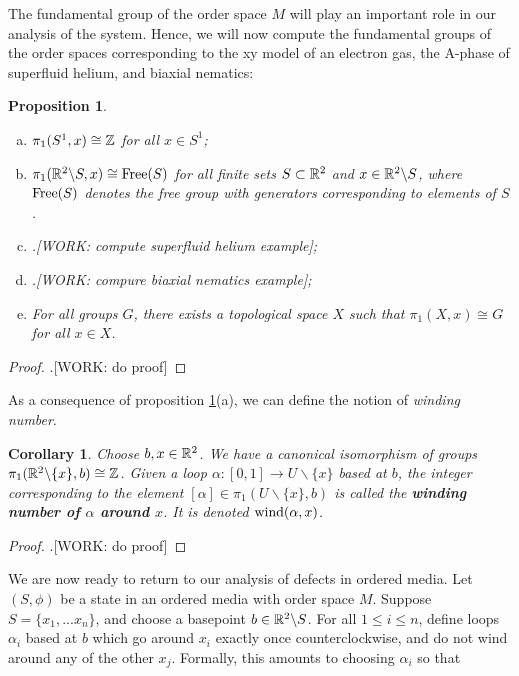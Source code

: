 \documentclass{article}
\newtheorem{corollary}{Corollary}[section]
\newtheorem{proposition}{Proposition}[section]
\theoremstyle{definition}
\numberwithin{figure}{section}
\begin{document}
The fundamental group of the order space $M$ will play an important role in our analysis of the system. Hence, we will now compute the fundamental groups of the order spaces corresponding to the xy model of an electron gas, the A-phase of superfluid helium, and biaxial nematics:

\begin{proposition}$\,$
\label{fundamental-group-computations}
\begin{enumerate}[(a)]
\item $\pi_1(S^1,x)\cong \mathbb{Z}$ for all $x\in S^1$;
\item $\pi_1(\mathbb{R}^2\backslash S,x)\cong\mathrm{Free}(S)$ for all finite sets $S\subset \mathbb{R}^2$ and $x\in \mathbb{R}^2\backslash S$, where $\mathrm{Free}(S)$ denotes the free group with generators corresponding to elements of $S$.
\item .[WORK: compute superfluid helium example];
\item .[WORK: compure biaxial nematics example];
\item For all groups $G$, there exists a topological space $X$ such that $\pi_1(X,x)\cong G$ for all $x\in X$.
\end{enumerate}
\end{proposition}
\begin{proof}.[WORK: do proof]
\end{proof}

As a consequence of proposition \ref{fundamental-group-computations}(a), we can define the notion of \textit{winding number}.

\begin{corollary} Choose $b,x\in \mathbb{R}^2$. We have a canonical isomorphism of groups $\pi_1(\mathbb{R}^2\backslash \{x\},b)\cong \mathbb{Z}$. Given a loop $\alpha:[0,1]\to U\backslash \{x\}$ based at $b$, the integer corresponding to the element $[\alpha]\in \pi_1(U\backslash \{x\},b)$ is called the \textbf{winding number of $\alpha$ around $x$}. It is denoted $\mathrm{wind}(\alpha,x)$.
\end{corollary}
\begin{proof}.[WORK: do proof]
\end{proof}

We are now ready to return to our analysis of defects in ordered media. Let $(S,\phi)$ be a state in an ordered media with order space $M$. Suppose $S=\{x_1, ...x_n\}$, and choose a basepoint $b\in \mathbb{R}^2\backslash S$. For all $1\leq i\leq n$, define loops $\alpha_i$ based at $b$ which go around $x_i$ exactly once counterclockwise, and do not wind around any of the other $x_j$. Formally, this amounts to choosing $\alpha_i$ so that
\end{document}
